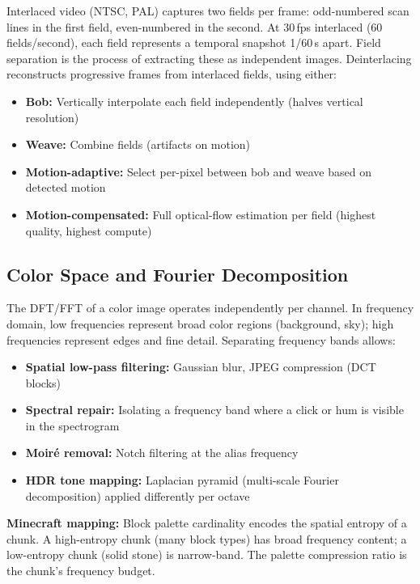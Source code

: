\documentclass[11pt,letterpaper]{article}
\begin{document}
Interlaced video (NTSC, PAL) captures two fields per frame: odd-numbered scan lines in the first field, even-numbered in the second. At 30\,fps interlaced (60 fields/second), each field represents a temporal snapshot 1/60\,s apart. Field separation is the process of extracting these as independent images. Deinterlacing reconstructs progressive frames from interlaced fields, using either:
\begin{itemize}[noitemsep]
  \item \textbf{Bob:} Vertically interpolate each field independently (halves vertical resolution)
  \item \textbf{Weave:} Combine fields (artifacts on motion)
  \item \textbf{Motion-adaptive:} Select per-pixel between bob and weave based on detected motion
  \item \textbf{Motion-compensated:} Full optical-flow estimation per field (highest quality, highest compute)
\end{itemize}

\subsection{Color Space and Fourier Decomposition}

The DFT/FFT of a color image operates independently per channel. In frequency domain, low frequencies represent broad color regions (background, sky); high frequencies represent edges and fine detail. Separating frequency bands allows:
\begin{itemize}[noitemsep]
  \item \textbf{Spatial low-pass filtering:} Gaussian blur, JPEG compression (DCT blocks)
  \item \textbf{Spectral repair:} Isolating a frequency band where a click or hum is visible in the spectrogram
  \item \textbf{Moir\'{e} removal:} Notch filtering at the alias frequency
  \item \textbf{HDR tone mapping:} Laplacian pyramid (multi-scale Fourier decomposition) applied differently per octave
\end{itemize}

\textbf{Minecraft mapping:} Block palette cardinality encodes the spatial entropy of a chunk. A high-entropy chunk (many block types) has broad frequency content; a low-entropy chunk (solid stone) is narrow-band. The palette compression ratio is the chunk's frequency budget.
\end{document}
